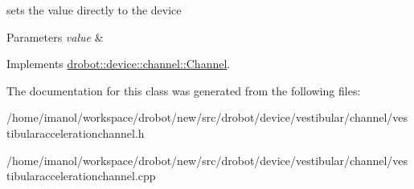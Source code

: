 sets the value directly to the device 


\begin{DoxyParams}{Parameters}
{\em value} & \\
\hline
\end{DoxyParams}


Implements \hyperlink{classdrobot_1_1device_1_1channel_1_1Channel_a612a3f6afe59e238583d6d40d9ddcaf8}{drobot\-::device\-::channel\-::\-Channel}.



The documentation for this class was generated from the following files\-:\begin{DoxyCompactItemize}
\item 
/home/imanol/workspace/drobot/new/src/drobot/device/vestibular/channel/vestibularaccelerationchannel.\-h\item 
/home/imanol/workspace/drobot/new/src/drobot/device/vestibular/channel/vestibularaccelerationchannel.\-cpp\end{DoxyCompactItemize}
